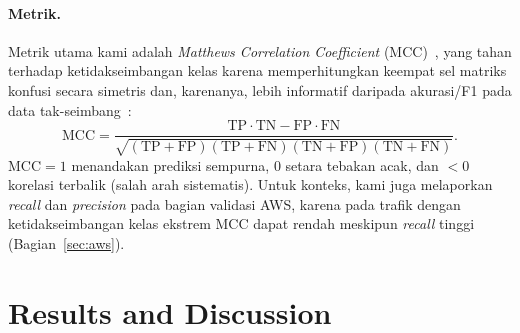 \documentclass[11pt,a4paper]{article}
\begin{document}
\paragraph{Metrik.} Metrik utama kami adalah \emph{Matthews Correlation Coefficient}
(MCC)~\cite{matthews}, yang tahan terhadap ketidakseimbangan kelas karena
memperhitungkan keempat sel matriks konfusi secara simetris dan, karenanya, lebih
informatif daripada akurasi/F1 pada data tak-seimbang~\cite{chicco}:
\begin{equation}
\mathrm{MCC} = \frac{\mathrm{TP}\cdot\mathrm{TN} - \mathrm{FP}\cdot\mathrm{FN}}
{\sqrt{(\mathrm{TP}{+}\mathrm{FP})(\mathrm{TP}{+}\mathrm{FN})
(\mathrm{TN}{+}\mathrm{FP})(\mathrm{TN}{+}\mathrm{FN})}}.
\end{equation}
$\mathrm{MCC}=1$ menandakan prediksi sempurna, $0$ setara tebakan acak, dan $<0$
korelasi terbalik (salah arah sistematis). Untuk konteks, kami juga melaporkan
\emph{recall} dan \emph{precision} pada bagian validasi AWS, karena pada trafik
dengan ketidakseimbangan kelas ekstrem MCC dapat rendah meskipun \emph{recall}
tinggi (Bagian~\ref{sec:aws}).

\section{Results and Discussion}
\label{sec:hasil}
\end{document}

